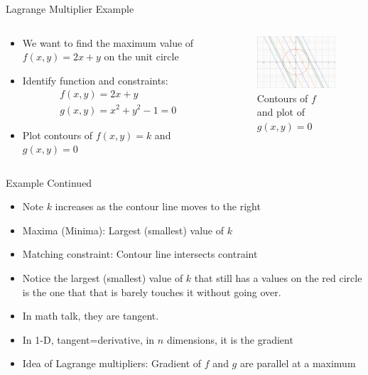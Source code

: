 \documentclass{beamer}
\begin{document}
\begin{frame}{Lagrange Multiplier Example}
  \begin{columns}
    \begin{column}{0.5\textwidth}
      \begin{itemize}
      \item We want to find the maximum value of $f(x,y)=2x+y$ on the unit circle
      \item Identify function and constraints:
        \begin{gather*}
          f(x,y)=2x+y\\
          g(x,y)=x^2+y^2-1=0
        \end{gather*}
      \item Plot contours of $f(x,y)=k$ and $g(x,y)=0$
      \end{itemize}
    \end{column}
    \begin{column}{0.5\textwidth}
      \begin{figure}[H]
        \centering
        \includegraphics[width=5.0cm]{gradient1.png}
        \caption{Contours of $f$ and plot of $g(x,y)=0$}
      \end{figure}
    \end{column}
  \end{columns}
\end{frame}
\begin{frame}{Example Continued}
  \begin{itemize}
  \item Note $k$ increases as the contour line moves to the right
  \item Maxima (Minima): Largest (smallest) value of $k$
  \item Matching constraint: Contour line intersects contraint
  \item Notice the largest (smallest) value of $k$ that still has a values on the red circle is the one that that is barely touches it without going over.
  \item In math talk, they are tangent.
  \item In 1-D, tangent=derivative, in $n$ dimensions, it is the gradient
  \item Idea of Lagrange multipliers: Gradient of $f$ and $g$ are parallel at a maximum
  \end{itemize}
\end{frame}
\end{document}

